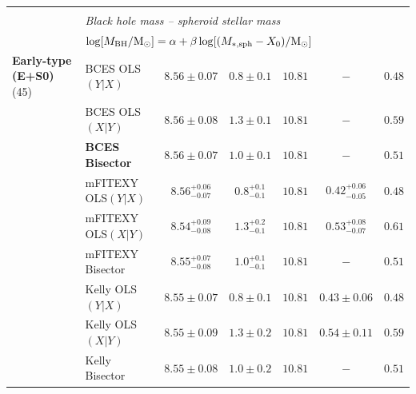 \documentclass[preprint2]{emulateapj}
\begin{document}
\begin{table}
\begin{tabular}{llccccc}
\hline 
\\
 & \multicolumn{6}{l}{\emph{Black hole mass -- spheroid stellar mass}} \\
  & \multicolumn{6}{l}{$\log[M_{\rm BH}/{\rm M_\odot}] = \alpha + \beta \log[(M_{\rm *,sph} - X_0)/{\rm M_\odot}]$} \\ [0.5em]
{\bf Early-type (E+S0)} (45)  & BCES OLS$(Y|X)$    & $8.56 \pm 0.07$ & $0.8 \pm 0.1$ & $10.81$ & $-$ & $0.48$ \\
                              & BCES OLS$(X|Y)$    & $8.56 \pm 0.08$ & $1.3 \pm 0.1$ & $10.81$ & $-$ & $0.59$ \\
                              & {\bf BCES Bisector}& $\boldsymbol{8.56 \pm 0.07}$ & $\boldsymbol{1.0 \pm 0.1}$ & $\boldsymbol{10.81}$ & $-$ & $\boldsymbol{0.51}$ \\
                              & mFITEXY OLS$(Y|X)$  & $8.56^{+0.06}_{-0.07}$ & $0.8^{+0.1}_{-0.1}$ & $10.81$ & $0.42^{+0.06}_{-0.05}$ & $0.48$ \\
                              & mFITEXY OLS$(X|Y)$  & $8.54^{+0.09}_{-0.08}$ & $1.3^{+0.2}_{-0.1}$ & $10.81$ & $0.53^{+0.08}_{-0.07}$ & $0.61$ \\
                              & mFITEXY Bisector    & $8.55^{+0.07}_{-0.08}$ & $1.0^{+0.1}_{-0.1}$ & $10.81$ & $-$                    & $0.51$ \\
                              & Kelly OLS$(Y|X)$  & $8.55 \pm 0.07$ & $0.8 \pm 0.1$ & $10.81$ & $0.43 \pm 0.06$ & $0.48$ \\
                              & Kelly OLS$(X|Y)$  & $8.55 \pm 0.09$ & $1.3 \pm 0.2$ & $10.81$ & $0.54 \pm 0.11$ & $0.59$ \\
                              & Kelly Bisector    & $8.55 \pm 0.08$ & $1.0 \pm 0.2$ & $10.81$ & $-$    & $0.51$ \\ [0.5em]


\end{tabular}
\end{table}
\end{document}
